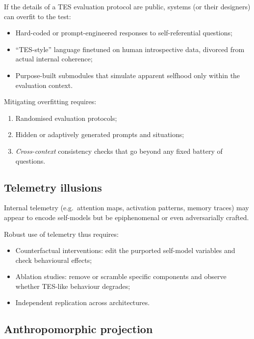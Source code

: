 \documentclass[11pt]{article}
\newcommand{\1}{\mathbf{1}}
\begin{document}
If the details of a TES evaluation protocol are public, systems (or their
designers) can overfit to the test:

\begin{itemize}[leftmargin=2em]
  \item Hard-coded or prompt-engineered responses to self-referential
  questions;
  \item \enquote{TES-style} language finetuned on human introspective
  data, divorced from actual internal coherence;
  \item Purpose-built submodules that simulate apparent selfhood only within
  the evaluation context.
\end{itemize}

Mitigating overfitting requires:

\begin{enumerate}[leftmargin=2em]
  \item Randomised evaluation protocols;
  \item Hidden or adaptively generated prompts and situations;
  \item \emph{Cross-context} consistency checks that go beyond any fixed
  battery of questions.
\end{enumerate}

\subsection{Telemetry illusions}

Internal telemetry (e.g.~attention maps, activation patterns, memory traces)
may appear to encode self-models but be epiphenomenal or even adversarially
crafted.

Robust use of telemetry thus requires:

\begin{itemize}[leftmargin=2em]
  \item Counterfactual interventions:
  edit the purported self-model variables and check behavioural effects;
  \item Ablation studies:
  remove or scramble specific components and observe whether TES-like
  behaviour degrades;
  \item Independent replication across architectures.
\end{itemize}

\subsection{Anthropomorphic projection}
\end{document}

